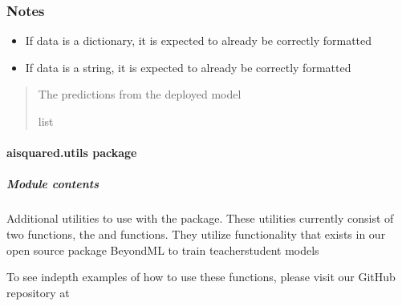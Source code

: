 \documentclass[letterpaper,10pt,english]{sphinxmanual}
\begin{document}
\begin{fulllineitems}
\begin{quote}
\begin{description}
\end{description}\end{quote}
\subsubsection*{Notes}
\begin{itemize}
\item {} 
\sphinxAtStartPar
If data is a dictionary, it is expected to already be
correctly formatted

\item {} 
\sphinxAtStartPar
If data is a string, it is expected to already be
correctly formatted

\end{itemize}
\begin{quote}\begin{description}
\sphinxAtStartPar
{} \textendash{} The predictions from the deployed model

\sphinxAtStartPar
list

\end{description}\end{quote}

\end{fulllineitems}


\sphinxstepscope


\paragraph{aisquared.utils package}
\label{\detokenize{aisquared.utils:aisquared-utils-package}}\label{\detokenize{aisquared.utils::doc}}

\subparagraph{Module contents}
\label{\detokenize{aisquared.utils:module-aisquared.utils}}\label{\detokenize{aisquared.utils:module-contents}}
\sphinxAtStartPar
Additional utilities to use with the  package. These utilities currently consist of two functions, the
 and  functions. They utilize functionality that exists in our open source package BeyondML
to train teacher\sphinxhyphen{}student models

\sphinxAtStartPar
To see in\sphinxhyphen{}depth examples of how to use these functions, please visit our GitHub repository at 
\end{document}
